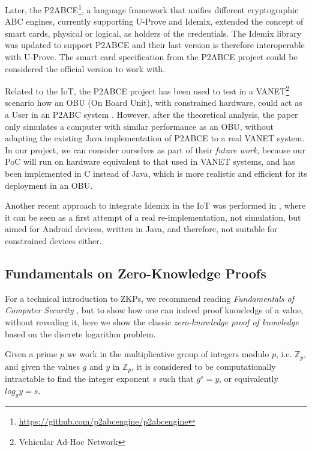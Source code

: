 
Later, the P2ABCE\footnote{\url{https://github.com/p2abcengine/p2abcengine}}, a language framework that unifies different cryptographic ABC engines, currently supporting U-Prove and Idemix, extended the concept of smart cards, physical or logical, as holders of the credentials. The Idemix library was updated to support P2ABCE and their last version is therefore interoperable with U-Prove. The smart card specification from the P2ABCE project could be considered the official version to work with.


Related to the IoT, the P2ABCE project has been used to test in a VANET\footnote{Vehicular Ad-Hoc Network} scenario how an OBU (On Board Unit), with constrained hardware, could act as a User in an P2ABC system \cite{vanet}. However, after the theoretical analysis, the paper only simulates a computer with similar performance as an OBU, without adapting the existing Java implementation of P2ABCE to a real VANET system. In our project, we can consider ourselves as part of their \textit{future work}, because our PoC will run on hardware equivalent to that used in VANET systems, and has been implemented in C instead of Java, which is more realistic and efficient for its deployment in an OBU.

Another recent approach to integrate Idemix in the IoT was performed in \cite{DBLP:journals/mis/BernabeRG17}, where it can be seen as a first attempt of a real re-implementation, not simulation, but aimed for Android devices, written in Java, and therefore, not suitable for constrained devices either.

\subsection{Fundamentals on Zero-Knowledge Proofs}

For a technical introduction to ZKPs, we recommend reading \textit{Fundamentals of Computer Security} \cite[Chapter 12]{book:856771}, but to show how one can indeed proof knowledge of a value, without revealing it, here we show the classic \textit{zero-knowledge proof of knowledge} based on the discrete logarithm problem.

Given a prime $p$ we work in the multiplicative group of integers modulo $p$, i.e. $\mathbb{Z}_p$, and given the values $g$ and $y$ in $\mathbb{Z}_p$, it is considered to be computationally intractable to find the integer exponent $s$ such that $g^s = y$, or equivalently $log_g y = s$.

